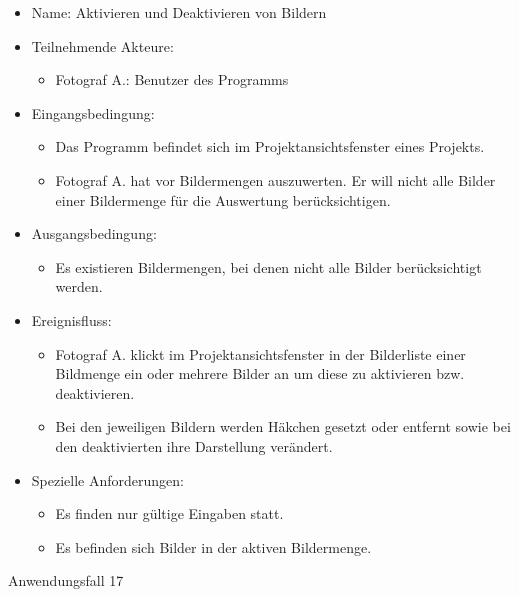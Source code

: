 	\begin{itemize}
		\item Name: Aktivieren und Deaktivieren von Bildern
		\item Teilnehmende Akteure:
		\begin{itemize}
			\item	Fotograf A.: Benutzer des Programms		
		\end{itemize}
		\item Eingangsbedingung:
		\begin{itemize}
			\item	Das Programm befindet sich im Projektansichtsfenster eines Projekts.
			\item Fotograf A. hat vor Bildermengen auszuwerten. Er will nicht alle Bilder einer Bildermenge für die Auswertung berücksichtigen.
		\end{itemize}
		\item Ausgangsbedingung:
		\begin{itemize}
			\item	Es existieren Bildermengen, bei denen nicht alle Bilder berücksichtigt werden.	
		\end{itemize}
		\item Ereignisfluss:
		\begin{itemize}
			\item Fotograf A. klickt im Projektansichtsfenster in der Bilderliste einer Bildmenge ein oder mehrere Bilder an um diese zu aktivieren bzw. deaktivieren.
			\item Bei den jeweiligen Bildern werden Häkchen gesetzt oder entfernt sowie bei den deaktivierten ihre Darstellung verändert.
		\end{itemize}
		\item Spezielle Anforderungen:
		\begin{itemize}
			\item	Es finden nur gültige Eingaben statt.
			\item Es befinden sich Bilder in der aktiven Bildermenge.
		\end{itemize}			
	\end{itemize}
	
	\begin{description}
		\item[Anwendungsfall 17]
	\end{description}
	
